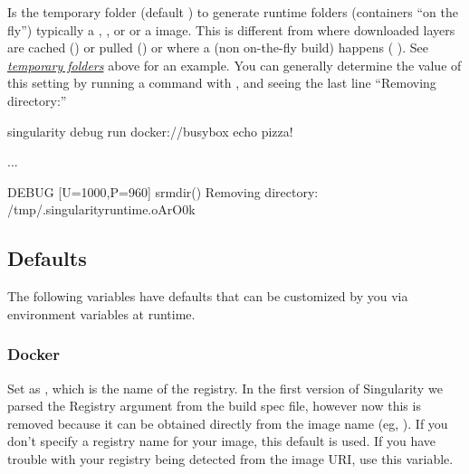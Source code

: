 \documentclass[letterpaper,10pt,english]{sphinxmanual}
\begin{document}
 Is the temporary folder (default ) to
generate runtime folders (containers “on the fly”) typically a ,  , or 
or a  image. This is different from where downloaded layers are cached
() or pulled () or where a (non on-the-fly build) happens (  ). See
{\hyperref[\detokenize{build_environment:temporary-folders}]{\emph{temporary folders}}} above for an example. You can generally determine the value of this
setting by running a command with  , and seeing the last line “Removing
directory:”

%
\begin{sphinxVerbatim}[commandchars=\\\{\}]
singularity \PYGZhy{}\PYGZhy{}debug run docker://busybox echo \PYGZdq{}pizza!\PYGZdq{}

...

DEBUG   [U=1000,P=960]     s\PYGZus{}rmdir()                                 Removing directory: /tmp/.singularity\PYGZhy{}runtime.oArO0k
\end{sphinxVerbatim}


\subsection{Defaults}
\label{\detokenize{build_environment:defaults}}
The following variables have defaults that can be customized by you via
environment variables at runtime.


\subsubsection{Docker}
\label{\detokenize{build_environment:docker}}
 Set as , which is the name of the registry. In
the first version of Singularity we parsed the Registry argument from
the build spec file, however now this is removed because it can be
obtained directly from the image name (eg, ). If you don’t specify a
registry name for your image, this default is used. If you have
trouble with your registry being detected from the image URI, use this
variable.
\end{document}
